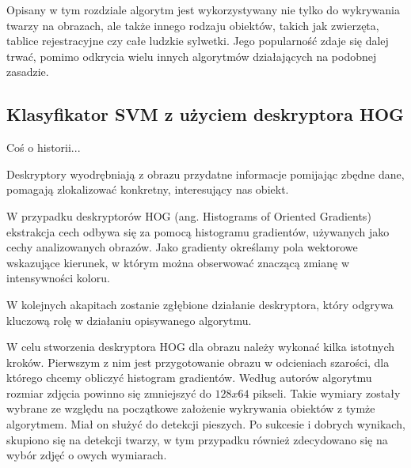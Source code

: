 Opisany w tym rozdziale algorytm jest wykorzystywany nie tylko do wykrywania twarzy na obrazach, ale także innego rodzaju obiektów, takich jak zwierzęta, tablice rejestracyjne czy całe ludzkie sylwetki. Jego popularność zdaje się dalej trwać, pomimo odkrycia wielu innych algorytmów działających na podobnej zasadzie. %


\subsection{Klasyfikator SVM z użyciem deskryptora HOG}
Coś o historii...

Deskryptory wyodrębniają z obrazu przydatne informacje pomijając zbędne dane, pomagają zlokalizować konkretny, interesujący nas obiekt. 

W przypadku deskryptorów HOG (ang. Histograms of Oriented Gradients) ekstrakcja cech odbywa się za pomocą histogramu gradientów, używanych jako cechy analizowanych obrazów. Jako gradienty określamy pola wektorowe wskazujące kierunek, w którym można obserwować 
znaczącą zmianę w intensywności koloru.

W kolejnych akapitach zostanie zgłębione działanie deskryptora, który odgrywa kluczową rolę w działaniu opisywanego algorytmu.

W celu stworzenia deskryptora HOG dla obrazu należy wykonać kilka istotnych kroków. Pierwszym z nim jest przygotowanie obrazu w odcieniach szarości, dla którego chcemy obliczyć histogram gradientów. Według autorów algorytmu rozmiar zdjęcia powinno się zmniejszyć do $128x64$ pikseli. Takie wymiary zostały wybrane ze względu na początkowe założenie wykrywania obiektów z tymże algorytmem. Miał on służyć do detekcji pieszych. Po sukcesie i dobrych wynikach, skupiono się na detekcji twarzy, w tym przypadku również zdecydowano się na wybór zdjęć o owych wymiarach.


